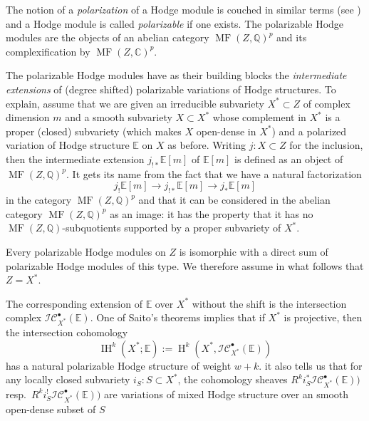 \documentclass[12pt,letterpaper]{amsart}
\numberwithin{equation}{section}
\def\CC{{\mathbb C}}
\def\EE{{\mathbb E}}
\def\QQ{{\mathbb Q}}
\def\Iscr{{\mathscr I}}
\def\Cscr{{\mathscr C}}
\def\pt{{\scriptscriptstyle\bullet}}
\newcommand\Hl{\operatorname{H}}
\newcommand\IH{\operatorname{IH}}
\newcommand\MF{\operatorname{MF}}
\theoremstyle{remark}
\begin{document}
The notion  of a \emph{polarization} of a Hodge module  is couched in similar terms (see \cite{saito:hmodules}) 
and a Hodge module is called \emph{polarizable} if one exists. 
The polarizable Hodge modules are the  objects of  an abelian category $\MF (Z,\QQ)^p$ and its complexification by  $\MF (Z,\CC)^p$.  

The polarizable Hodge modules  have as their building blocks the  \emph{intermediate extensions} of (degree shifted) polarizable variations of 
Hodge structures. To explain, assume that we are given an irreducible subvariety $X^*\subset Z$ of complex dimension 
$m$ and a smooth subvariety $X\subset X^*$ whose complement in $X^*$  is a proper (closed) subvariety (which makes $X$ open-dense in $X^*$) and a polarized variation of 
Hodge structure $\EE$ on $X$ as before.
Writing   $j: X\subset Z$  for the inclusion, then the  intermediate extension
$j_{!*}\EE[m]$ of $\EE[m]$ is defined as  an object of $\MF(Z, \QQ)^p$. 
It gets its name from the fact that we have a natural factorization 
\[
j_!\EE[m]\to j_{!*}\EE[m]\to j_{*}\EE[m]
\]
in the category $\MF (Z,\QQ)^p$ and that it can be considered in the abelian category $\MF (Z,\QQ)^p$ as an image: it 
has the property that it has no $\MF (Z,\QQ)$-subquotients  supported by a proper subvariety of $X^*$. 


Every  polarizable Hodge modules on $Z$ is isomorphic with a direct sum of polarizable Hodge modules of this type. We therefore assume 
in what follows that $Z=X^*$.

The corresponding extension of $\EE$ over $X^*$ without the shift is the  intersection complex $\Iscr\Cscr_{X^*}^\pt(\EE)$. 
One of Saito's theorems implies  that if $X^*$ is projective, then the intersection cohomology 
\[
\IH^k(X^*; \EE):=\Hl^k(X^*, \Iscr\Cscr_{X^*}^\pt(\EE))
\]
 has a natural polarizable Hodge structure of weight 
$w+k$. it also tells us that  for any locally closed subvariety $i_S: S\subset X^*$,  the cohomology  sheaves 
$R^k i^*_S\Iscr\Cscr_{X^*}^\pt(\EE))$ resp.\  $R^k i^!_S\Iscr\Cscr_{X^*}^\pt(\EE))$ are variations of mixed Hodge structure
over an smooth open-dense subset of  $S$
\end{document}
